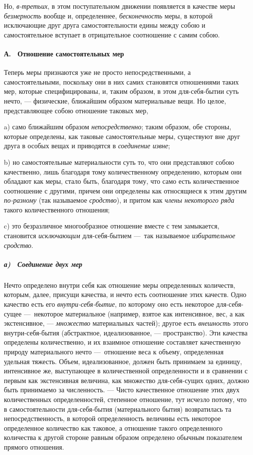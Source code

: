 Но, {\em в-третьих}, в этом поступательном движении
появляется в качестве меры {\em безмерность} вообще и,
определеннее, {\em бесконечность} меры, в которой
исключающие друг друга самостоятельности едины между собою и
самостоятельное вступает в отрицательное соотношение с самим собою.

\paragraph[А. \ Отношение самостоятельных мер]{А. \ Отношение
самостоятельных мер}
\hypertarget{Toc478978681}{}Теперь меры признаются уже не просто
непосредственными, а самостоятельными, поскольку они в них самих становятся
отношениями таких мер, которые специфицированы, и, таким образом, в этом
для-себя-бытии суть нечто, — физические, ближайшим образом материальные
вещи. Но целое, представляющее собою отношение таковых мер,

a) само ближайшим образом {\em непосредственно}; таким
образом, обе стороны, которые определены, как таковые самостоятельные меры,
существуют вне друг друга в особых вещах и приводятся в
{\em соединение извне};

b) но самостоятельные материальности суть то, что они представляют собою
качественно, лишь благодаря тому количественному определению, которым они
обладают как меры, стало быть, благодаря тому, что само есть количественное
соотношение с другими, причем они определены как относящиеся к этим другим
{\em по-разному} (так называемое
{\em сродство}), и притом как
{\em члены некоторого ряда} такого количественного
отношения;

c) это безразличное многообразное отношение вместе с тем замыкается,
становится {\em исключающим} для-себя-бытием —~так
называемое {\em избирательное сродство}.

\subparagraph[а) \ Соединение двух мер]{а) \ Соединение двух мер}
\hypertarget{Toc478978682}{}Нечто определено внутри себя как отношение меры
определенных количеств, которым, далее, присущи качества, и нечто есть
соотношение этих качеств. Одно качество есть его
{\em внутри-себя-бытие}, по которому оно есть некоторое
для-себя-сущее —~некоторое материальное (например, взятое как интенсивное,
вес, а как экстенсивное, — {\em множество} материальных
частей); другое есть {\em внешность} этого
внутри-себя-бытия (абстрактное, идеализованное, — пространство). Эти
качества определены количественно, и их взаимное отношение составляет
качественную природу материального нечто —~отношение веса к объему,
определенная удельная тяжесть. Объем, идеализованное, должен быть принимаем
за единицу, интенсивное же, выступающее в количественной определенности и в
сравнении с первым как экстенсивная величина, как множество для-себя-сущих
одних, должно быть принимаемо за численность. — Чисто качественное
отношение этих двух количественных определенностей, степенное отношение,
тут исчезло потому, что в самостоятельности для-себя-бытия (материального
бытия) возвратилась та непосредственность, в которой определенность
величины есть некоторое определенное количество как таковое, а отношение
такого определенного количества к другой стороне равным образом определено
обычным показателем прямого отношения.

